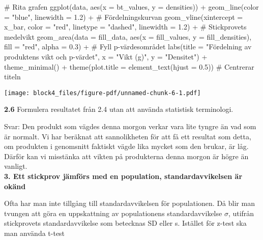 \documentclass[
  letterpaper,
  DIV=11,
  numbers=noendperiod]{scrartcl}
\newenvironment{Shaded}{\begin{snugshade}}{\end{snugshade}}
\newcommand{\AttributeTok}[1]{\textcolor[rgb]{0.40,0.45,0.13}{#1}}
\newcommand{\CommentTok}[1]{\textcolor[rgb]{0.37,0.37,0.37}{#1}}
\newcommand{\FloatTok}[1]{\textcolor[rgb]{0.68,0.00,0.00}{#1}}
\newcommand{\FunctionTok}[1]{\textcolor[rgb]{0.28,0.35,0.67}{#1}}
\newcommand{\NormalTok}[1]{\textcolor[rgb]{0.00,0.23,0.31}{#1}}
\newcommand{\SpecialCharTok}[1]{\textcolor[rgb]{0.37,0.37,0.37}{#1}}
\newcommand{\StringTok}[1]{\textcolor[rgb]{0.13,0.47,0.30}{#1}}
\begin{document}
\begin{Shaded}
\begin{Highlighting}[]
\CommentTok{\# Rita grafen}
\FunctionTok{ggplot}\NormalTok{(data, }\FunctionTok{aes}\NormalTok{(}\AttributeTok{x =}\NormalTok{ bt\_values, }\AttributeTok{y =}\NormalTok{ densities)) }\SpecialCharTok{+}
  \FunctionTok{geom\_line}\NormalTok{(}\AttributeTok{color =} \StringTok{"blue"}\NormalTok{, }\AttributeTok{linewidth =} \FloatTok{1.2}\NormalTok{) }\SpecialCharTok{+}  \CommentTok{\# Fördelningskurvan}
  \FunctionTok{geom\_vline}\NormalTok{(}\AttributeTok{xintercept =}\NormalTok{ x\_bar, }\AttributeTok{color =} \StringTok{"red"}\NormalTok{, }\AttributeTok{linetype =} \StringTok{"dashed"}\NormalTok{,}
  \AttributeTok{linewidth =} \FloatTok{1.2}\NormalTok{) }\SpecialCharTok{+}  \CommentTok{\# Stickprovets medelvikt}
  \FunctionTok{geom\_area}\NormalTok{(}\AttributeTok{data =}\NormalTok{ fill\_data, }\FunctionTok{aes}\NormalTok{(}\AttributeTok{x =}\NormalTok{ fill\_values, }\AttributeTok{y =}\NormalTok{ fill\_densities),}
  \AttributeTok{fill =} \StringTok{"red"}\NormalTok{, }\AttributeTok{alpha =} \FloatTok{0.3}\NormalTok{) }\SpecialCharTok{+}  \CommentTok{\# Fyll p{-}värdesområdet}
  \FunctionTok{labs}\NormalTok{(}\AttributeTok{title =} \StringTok{"Fördelning av produktens vikt och p{-}värdet"}\NormalTok{,}
       \AttributeTok{x =} \StringTok{"Vikt (g)"}\NormalTok{, }\AttributeTok{y =} \StringTok{"Densitet"}\NormalTok{) }\SpecialCharTok{+}
  \FunctionTok{theme\_minimal}\NormalTok{() }\SpecialCharTok{+}
  \FunctionTok{theme}\NormalTok{(}\AttributeTok{plot.title =} \FunctionTok{element\_text}\NormalTok{(}\AttributeTok{hjust =} \FloatTok{0.5}\NormalTok{))  }\CommentTok{\# Centrerar titeln}
\end{Highlighting}
\end{Shaded}

\texttt{[image: block4\_files/figure-pdf/unnamed-chunk-6-1.pdf]}

\textbf{2.6} Formulera resultatet från 2.4 utan att använda statistisk
terminologi.

\hfill\break
Svar: Den produkt som vägdes denna morgon verkar vara lite tyngre än vad
som är normalt. Vi har beräknat att sannolikheten för att få ett
resultat som detta, om produkten i genomsnitt faktiskt vägde lika mycket
som den brukar, är låg. Därför kan vi misstänka att vikten på
produkterna denna morgon är högre än vanligt.\\

\textbf{3. Ett stickprov jämförs med en population, standardavvikelsen
är okänd}

Ofta har man inte tillgång till standardavvikelsen för populationen. Då
blir man tvungen att göra en uppskattning av populationens
standardavvikelse \(\sigma\), utifrån stickprovets standardavvikelse som
betecknas SD eller s. Istället för z-test ska man använda t-test
\end{document}
